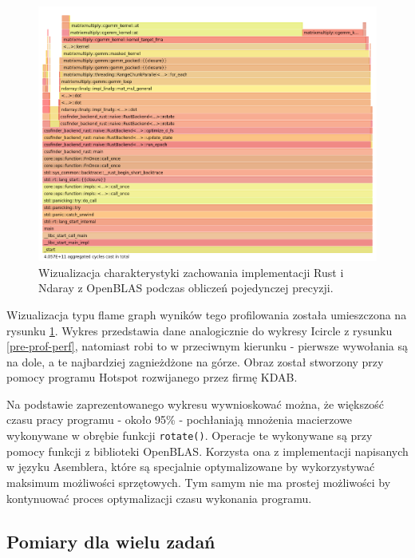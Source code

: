 \documentclass[11pt, a4paper]{article}
\newcommand{\code}[1]{\texttt{#1}}
\begin{document}
\begin{sloppypar}
    \FloatBarrier
    \begin{figure}[ht]
      \centering
      \includegraphics[width=1.0\textwidth]{"resources/rust_flame_graph_perf.png"}
      \caption{Wizualizacja charakterystyki zachowania implementacji Rust i Ndaray z OpenBLAS podczas obliczeń pojedynczej precyzji.}
      \label{rust-flame-graph-prof}
    \end{figure}
    \FloatBarrier

    Wizualizacja typu flame graph wyników tego profilowania została umieszczona na rysunku
    \ref{rust-flame-graph-prof}. Wykres przedstawia dane analogicznie do wykresy Icircle
    z rysunku \ref{pre-prof-perf}, natomiast robi to w przeciwnym kierunku - pierwsze wywołania
    są na dole, a te najbardziej zagnieżdżone na górze. Obraz został stworzony przy pomocy
    programu Hotspot\cite{HOTSPOT} rozwijanego przez firmę KDAB.

    Na podstawie zaprezentowanego wykresu wywnioskować można, że większość czasu pracy programu
    - około 95\% - pochłaniają mnożenia macierzowe wykonywane w obrębie funkcji \code{rotate()}.
    Operacje te wykonywane są przy pomocy funkcji z biblioteki OpenBLAS. Korzysta ona z implementacji
    napisanych w języku Asemblera, które są specjalnie optymalizowane by wykorzystywać
    maksimum możliwości sprzętowych. Tym samym nie ma prostej możliwości by kontynuować proces
    optymalizacji czasu wykonania programu.

    \subsection{Pomiary dla wielu zadań}



\end{sloppypar}
\end{document}
